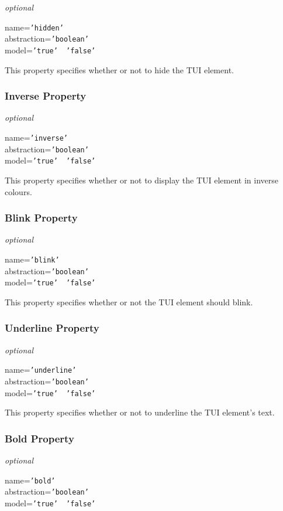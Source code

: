 \emph{optional}

name=\texttt{'hidden'}\\
abstraction=\texttt{'boolean'}\\
model=\texttt{'true' \vline\ 'false'}

This property specifies whether or not to hide the TUI element.

\subsubsection{Inverse Property}

\emph{optional}

name=\texttt{'inverse'}\\
abstraction=\texttt{'boolean'}\\
model=\texttt{'true' \vline\ 'false'}

This property specifies whether or not to display the TUI element in inverse
colours.

\subsubsection{Blink Property}

\emph{optional}

name=\texttt{'blink'}\\
abstraction=\texttt{'boolean'}\\
model=\texttt{'true' \vline\ 'false'}

This property specifies whether or not the TUI element should blink.

\subsubsection{Underline Property}

\emph{optional}

name=\texttt{'underline'}\\
abstraction=\texttt{'boolean'}\\
model=\texttt{'true' \vline\ 'false'}

This property specifies whether or not to underline the TUI element's text.

\subsubsection{Bold Property}

\emph{optional}

name=\texttt{'bold'}\\
abstraction=\texttt{'boolean'}\\
model=\texttt{'true' \vline\ 'false'}

